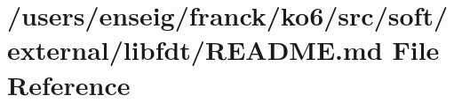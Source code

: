 \hypertarget{src_2soft_2external_2libfdt_2README_8md}{\section{/users/enseig/franck/ko6/src/soft/external/libfdt/\-R\-E\-A\-D\-M\-E.md File Reference}
\label{src_2soft_2external_2libfdt_2README_8md}
}
